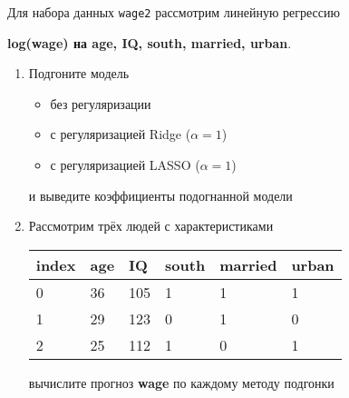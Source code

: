 \begin{exercise}
Для набора данных \texttt{wage2} рассмотрим линейную регрессию 
\begin{center}
	\textbf{log(wage) на age, IQ, south, married, urban}.
\end{center}
\begin{enumerate}
	\item Подгоните модель
	\begin{itemize}
		\item без регуляризации
		\item с регуляризацией Ridge (\(\alpha=1\))
		\item с регуляризацией LASSO (\(\alpha=1\))
	\end{itemize}
	и выведите коэффициенты подогнанной модели
	\item Рассмотрим трёх людей с характеристиками
	\begin{center}
		\begin{tabular}{|l||l|l|l|l|l|}\hline
			index & age & IQ & south & married & urban \\ \hline\hline
			0 & 36 & 105 & 1 & 1 & 1 \\
			1 & 29 & 123 & 0 & 1 & 0 \\
			2 & 25 & 112 & 1 & 0 & 1 \\ \hline
		\end{tabular}
	\end{center}
	вычислите прогноз \textbf{wage} по каждому методу подгонки
\end{enumerate}
\end{exercise}

